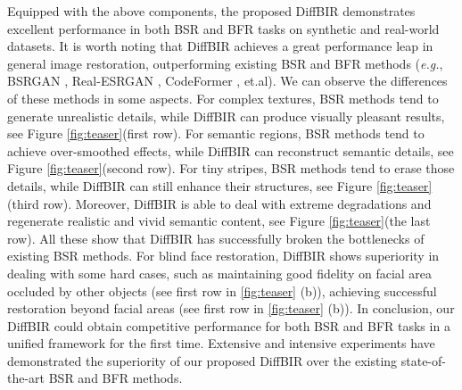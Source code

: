 \documentclass{article}
\begin{document}
Equipped with the above components, the proposed DiffBIR demonstrates excellent performance in both BSR and BFR tasks on synthetic and real-world datasets. It is worth noting that DiffBIR achieves a great performance leap in general image restoration, outperforming existing BSR and BFR methods (\textit{e.g.}, BSRGAN \cite{bsrgan}, Real-ESRGAN \cite{realesrgan}, CodeFormer \cite{codeformer}, et.al). We can observe the differences of these methods in some aspects. For complex textures, BSR methods tend to generate unrealistic details, while DiffBIR can produce visually  pleasant results, see Figure \ref{fig:teaser}(first row). For semantic regions, BSR methods tend to achieve over-smoothed effects, while DiffBIR can reconstruct semantic details, see Figure \ref{fig:teaser}(second row). For tiny stripes, BSR methods tend to erase those details, while DiffBIR can still enhance their structures, see Figure \ref{fig:teaser}(third row). 
Moreover, DiffBIR is able to deal with extreme degradations and regenerate realistic and vivid semantic content, see Figure \ref{fig:teaser}(the last row).
All these show that DiffBIR has successfully broken the bottlenecks of existing BSR methods. For blind face restoration, DiffBIR shows superiority in dealing with some hard cases, such as maintaining good fidelity on facial area occluded by other objects (see first row in \ref{fig:teaser} (b)), achieving successful restoration beyond facial areas (see first row in \ref{fig:teaser} (b)). In conclusion, our DiffBIR could obtain competitive performance for both BSR and BFR tasks in a unified framework for the first time. Extensive and intensive experiments have demonstrated the superiority of our proposed DiffBIR over the existing state-of-the-art BSR and BFR methods.
\end{document}
